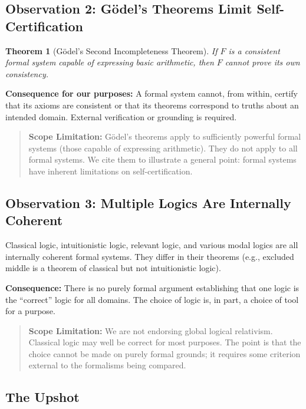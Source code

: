 \documentclass[12pt]{article}
\newtheorem{theorem}{Theorem}[section]
\theoremstyle{definition}
\theoremstyle{remark}
\begin{document}
\subsection{Observation 2: G\"{o}del's Theorems Limit Self-Certification}

\begin{theorem}[G\"{o}del's Second Incompleteness Theorem]\label{thm:godel}
If $F$ is a consistent formal system
capable of expressing basic arithmetic, then $F$ cannot prove its own consistency.
\end{theorem}

\textbf{Consequence for our purposes:} A formal system cannot, from within, certify that its
axioms are consistent or that its theorems correspond to truths about an intended domain.
External verification or grounding is required.

\begin{quote}
\textbf{Scope Limitation:} G\"{o}del's theorems apply to sufficiently powerful formal systems (those
capable of expressing arithmetic). They do not apply to all formal systems. We cite them
to illustrate a general point: formal systems have inherent limitations on self-certification.
\end{quote}

\subsection{Observation 3: Multiple Logics Are Internally Coherent}

Classical logic, intuitionistic logic, relevant logic, and various modal logics are all internally
coherent formal systems. They differ in their theorems (e.g., excluded middle is a theorem of
classical but not intuitionistic logic).

\textbf{Consequence:} There is no purely formal argument establishing that one logic is the ``correct'' logic for all domains. The choice of logic is, in part, a choice of tool for a purpose.

\begin{quote}
\textbf{Scope Limitation:} We are not endorsing global logical relativism. Classical logic may well
be correct for most purposes. The point is that the choice cannot be made on purely formal
grounds; it requires some criterion external to the formalisms being compared.
\end{quote}

\subsection{The Upshot}
\end{document}
